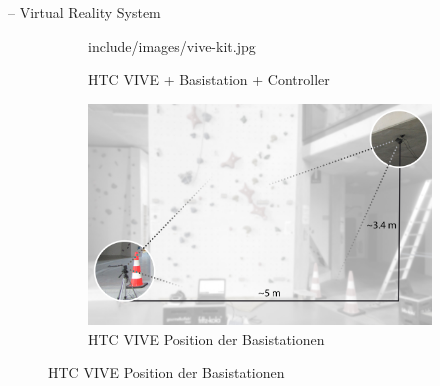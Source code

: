 \begin{frame}{\currentname{} -- Virtual Reality System}
	\begin{figure}
		\begin{subfigure}[t]{0.49\textwidth}
			\centering
			\begin{overpic}[width=\textwidth]{include/images/vive-kit.jpg}
			\end{overpic}
			\caption{HTC VIVE + Basistation + Controller}
		\end{subfigure}
		\begin{subfigure}[t]{0.49\textwidth}
			\centering
			\includegraphics[width=\textwidth]{include/images/vive-setup-solution.jpg}
			\caption{HTC VIVE Position der Basistationen}
		\end{subfigure}
	\end{figure}
\end{frame}

